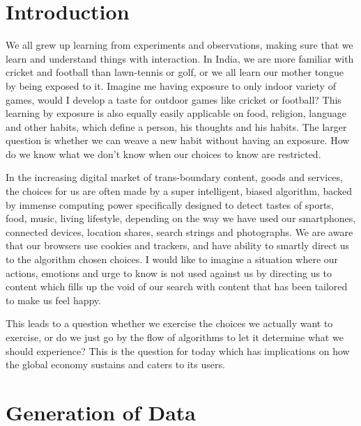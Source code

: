\begin{multicols}{2}

\section{Introduction}

We all grew up learning from experiments and observations, making sure that we learn and understand things with interaction. In India, we are more familiar with cricket and football than lawn-tennis or golf, or we all learn our mother tongue by being exposed to it. Imagine me having exposure to only indoor variety of games, would I develop a taste for outdoor games like cricket or football? This learning by exposure is also equally easily applicable on food, religion, language and other habits, which define a person, his thoughts and his habits. The larger question is whether we can weave a new habit without having an exposure. How do we know what we don’t know when our choices to know are restricted. 

In the increasing digital market of trans-boundary content, goods and services, the choices for us are often made by a super intelligent, biased algorithm, backed by immense computing power specifically designed to detect tastes of sports, food, music, living lifestyle, depending on the way we have used our smartphones, connected devices, location shares, search strings and photographs. We are aware that our browsers use cookies and trackers, and have ability to smartly direct us to the algorithm chosen choices. I would like to imagine a situation where our actions, emotions and urge to know is not used against us by directing us to content which fills up the void of our search with content that has been tailored to make us feel happy.

This leads to a question whether we exercise the choices we actually want to exercise, or do we just go by the flow of algorithms to let it determine what we should experience? This is the question for today which has implications on how the global economy sustains and caters to its users.

\section{Generation of Data}


\end{multicols}

